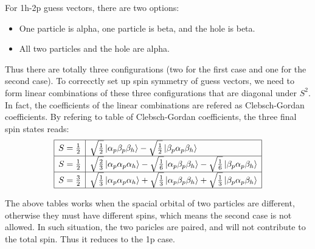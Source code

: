 For 1h-2p guess vectors, there are two options:
\begin{itemize}
	\item One particle is alpha, one particle is beta, and the hole is beta.
	\item All two particles and the hole are alpha.
\end{itemize}

Thus there are totally three configurations (two for the first case and one for the second case).
To correcctly set up spin symmetry of guess vectors, we need to form linear combinations of these three configurations that are diagonal under $S^2$.
In fact, the coefficients of the linear combinations are refered as Clebsch-Gordan coefficients.
By refering to table of Clebsch-Gordan coefficients, the three final spin states reads:
\begin{equation}
	\begin{array}{|l|l|}
		\hline
		S=\frac{1}{2} & \sqrt{\frac{1}{2}} \ket{\alpha_p \beta_p \beta_h} - \sqrt{\frac{1}{2}} \ket{\beta_p \alpha_p \beta_h}
		\\
		\hline
		S=\frac{1}{2} & \sqrt{\frac{2}{3}} \ket{\alpha_p \alpha_p \alpha_h} - \sqrt{\frac{1}{6}} \ket{\alpha_p \beta_p \beta_h} - \sqrt{\frac{1}{6}} \ket{\beta_p \alpha_p \beta_h}
		\\
		\hline
		S=\frac{3}{2} & \sqrt{\frac{1}{3}} \ket{\alpha_p \alpha_p \alpha_h} + \sqrt{\frac{1}{3}} \ket{\alpha_p \beta_p \beta_h} + \sqrt{\frac{1}{3}} \ket{\beta_p \alpha_p \beta_h}
		\\
		\hline
	\end{array}
\end{equation}

The above tables works when the spacial orbital of two particles are different, otherwise they must have different spins, which means the second case is not allowed.
In such situation, the two paricles are paired, and will not contribute to the total spin.
Thus it reduces to the 1p case.

